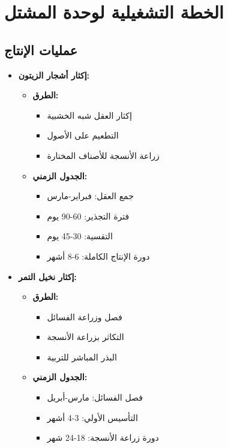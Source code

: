 \section{الخطة التشغيلية لوحدة المشتل}

\subsection{عمليات الإنتاج}
\begin{itemize}
    \item \textbf{إكثار أشجار الزيتون:}
    \begin{itemize}
        \item \textbf{الطرق:}
        \begin{itemize}
            \item إكثار العقل شبه الخشبية
            \item التطعيم على الأصول
            \item زراعة الأنسجة للأصناف المختارة
        \end{itemize}
        \item \textbf{الجدول الزمني:}
        \begin{itemize}
            \item جمع العقل: فبراير-مارس
            \item فترة التجذير: 60-90 يوم
            \item التقسية: 30-45 يوم
            \item دورة الإنتاج الكاملة: 6-8 أشهر
        \end{itemize}
    \end{itemize}
    
    \item \textbf{إكثار نخيل التمر:}
    \begin{itemize}
        \item \textbf{الطرق:}
        \begin{itemize}
            \item فصل وزراعة الفسائل
            \item التكاثر بزراعة الأنسجة
            \item البذر المباشر للتربية
        \end{itemize}
        \item \textbf{الجدول الزمني:}
        \begin{itemize}
            \item فصل الفسائل: مارس-أبريل
            \item التأسيس الأولي: 3-4 أشهر
            \item دورة زراعة الأنسجة: 18-24 شهر
        \end{itemize}
    \end{itemize}
\end{itemize}

